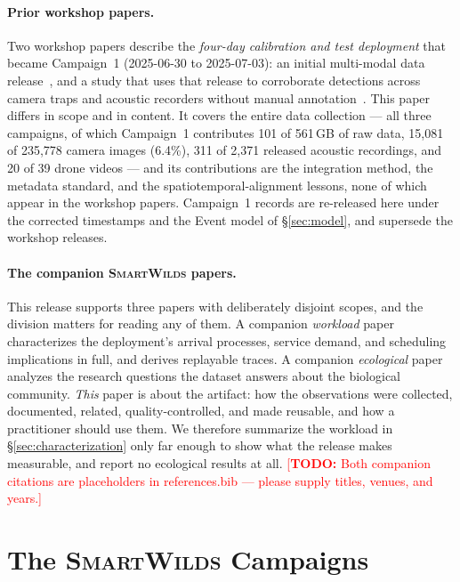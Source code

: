 \documentclass[sigconf]{acmart}
\newcommand{\smartwilds}{\textsc{SmartWilds}\xspace}
\newcommand{\TODO}[1]{\textcolor{red}{\footnotesize[\textbf{TODO:} #1]}}
\newcommand{\TODO}[1]{}
\begin{document}
\paragraph{Prior workshop papers.}
Two workshop papers describe the \emph{four-day calibration and test
deployment} that became Campaign~1 (2025-06-30 to 2025-07-03): an
initial multi-modal data release~\cite{kline2025smartwilds}, and a
study that uses that release to corroborate detections across camera
traps and acoustic recorders without manual
annotation~\cite{pillai2026corroboration}.
This paper differs in scope and in content. It covers the entire data
collection --- all three campaigns, of which Campaign~1 contributes
101 of 561\,GB of raw data, 15{,}081 of 235{,}778 camera images (6.4\%),
311 of 2{,}371 released acoustic recordings, and 20 of 39 drone videos
--- and its contributions are the integration method, the metadata
standard, and the spatiotemporal-alignment lessons, none of which appear
in the workshop papers. Campaign~1 records are re-released here under
the corrected timestamps and the Event model of \S\ref{sec:model}, and
supersede the workshop releases.

\paragraph{The companion \smartwilds papers.}
This release supports three papers with deliberately disjoint scopes,
and the division matters for reading any of them. A companion
\emph{workload} paper~\cite{smartwilds_workload} characterizes the
deployment's arrival processes, service demand, and scheduling
implications in full, and derives replayable traces. A companion
\emph{ecological} paper~\cite{smartwilds_ecology} analyzes the research
questions the dataset answers about the biological community.
\emph{This} paper is about the artifact: how the observations were
collected, documented, related, quality-controlled, and made reusable,
and how a practitioner should use them. We therefore summarize the
workload in \S\ref{sec:characterization} only far enough to show what
the release makes measurable, and report no ecological results at all.
\TODO{Both companion citations are placeholders in references.bib ---
please supply titles, venues, and years.}

\section{The \smartwilds Campaigns}
\label{sec:campaign}
\end{document}
